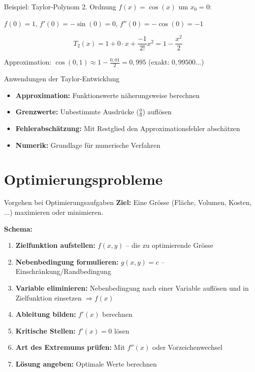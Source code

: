 \documentclass[a4paper,fontsize = 7pt]{scrartcl}
\begin{document}
\begin{subbox}{Beispiel: Taylor-Polynom 2. Ordnung}
$f(x) = \cos(x)$ um $x_0 = 0$:

$f(0) = 1$, $f'(0) = -\sin(0) = 0$, $f''(0) = -\cos(0) = -1$

$$T_2(x) = 1 + 0 \cdot x + \frac{-1}{2!} x^2 = 1 - \frac{x^2}{2}$$

Approximation: $\cos(0{,}1) \approx 1 - \frac{0{,}01}{2} = 0{,}995$ (exakt: $0{,}99500\ldots$)
\end{subbox}

\begin{mainbox}{Anwendungen der Taylor-Entwicklung}
\begin{itemize}
	\item \textbf{Approximation:} Funktionswerte näherungsweise berechnen
	\item \textbf{Grenzwerte:} Unbestimmte Ausdrücke ($\frac{0}{0}$) auflösen
	\item \textbf{Fehlerabschätzung:} Mit Restglied den Approximationsfehler abschätzen
	\item \textbf{Numerik:} Grundlage für numerische Verfahren
\end{itemize}
\end{mainbox}

\section{Optimierungsprobleme}

\begin{mainbox}{Vorgehen bei Optimierungsaufgaben}
\textbf{Ziel:} Eine Grösse (Fläche, Volumen, Kosten, ...) maximieren oder minimieren.

\textbf{Schema:}
\begin{enumerate}
	\item \textbf{Zielfunktion aufstellen:} $f(x, y)$ -- die zu optimierende Grösse
	\item \textbf{Nebenbedingung formulieren:} $g(x, y) = c$ -- Einschränkung/Randbedingung
	\item \textbf{Variable eliminieren:} Nebenbedingung nach einer Variable auflösen und in Zielfunktion einsetzen $\Rightarrow f(x)$
	\item \textbf{Ableitung bilden:} $f'(x)$ berechnen
	\item \textbf{Kritische Stellen:} $f'(x) = 0$ lösen
	\item \textbf{Art des Extremums prüfen:} Mit $f''(x)$ oder Vorzeichenwechsel
	\item \textbf{Lösung angeben:} Optimale Werte berechnen
\end{enumerate}
\end{mainbox}
\end{document}
